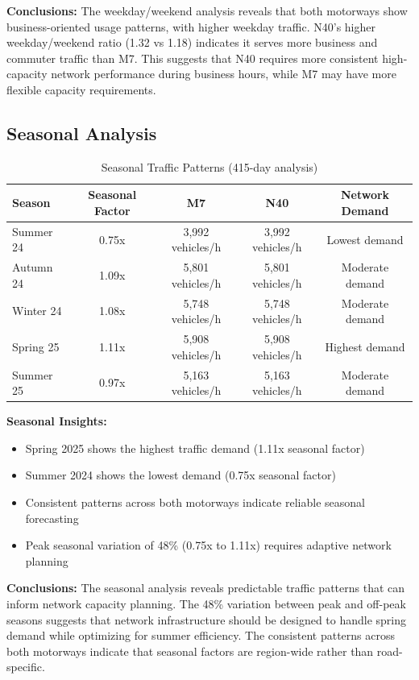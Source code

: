 \documentclass[MScCS]{uccthesis}
\begin{document}
\textbf{Conclusions:} The weekday/weekend analysis reveals that both motorways show business-oriented usage patterns, with higher weekday traffic. N40's higher weekday/weekend ratio (1.32 vs 1.18) indicates it serves more business and commuter traffic than M7. This suggests that N40 requires more consistent high-capacity network performance during business hours, while M7 may have more flexible capacity requirements.

\subsection{Seasonal Analysis}

\begin{table}[H]
\centering
\caption{Seasonal Traffic Patterns (415-day analysis)}
\label{tab:seasonal_patterns}
\begin{tabular}{|l|c|c|c|c|}
\hline
\textbf{Season} & \textbf{Seasonal Factor} & \textbf{M7} & \textbf{N40} & \textbf{Network Demand} \\
\hline
Summer 24 & 0.75x & 3,992 vehicles/h & 3,992 vehicles/h& Lowest demand \\
\hline
Autumn 24 & 1.09x & 5,801 vehicles/h & 5,801 vehicles/h & Moderate demand \\
\hline
Winter 24 & 1.08x & 5,748 vehicles/h & 5,748 vehicles/h & Moderate demand \\
\hline
Spring 25 & 1.11x & 5,908 vehicles/h & 5,908 vehicles/h & Highest demand \\
\hline
Summer 25 & 0.97x & 5,163 vehicles/h & 5,163 vehicles/h & Moderate demand \\
\hline
\end{tabular}
\end{table}

\textbf{Seasonal Insights:}
\begin{itemize}
\item Spring 2025 shows the highest traffic demand (1.11x seasonal factor)
\item Summer 2024 shows the lowest demand (0.75x seasonal factor)
\item Consistent patterns across both motorways indicate reliable seasonal forecasting
\item Peak seasonal variation of 48\% (0.75x to 1.11x) requires adaptive network planning
\end{itemize}

\textbf{Conclusions:} The seasonal analysis reveals predictable traffic patterns that can inform network capacity planning. The 48\% variation between peak and off-peak seasons suggests that network infrastructure should be designed to handle spring demand while optimizing for summer efficiency. The consistent patterns across both motorways indicate that seasonal factors are region-wide rather than road-specific.
\end{document}
